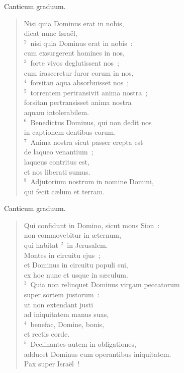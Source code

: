 \lettrine[lines=3,image=true,loversize=0.05,lraise=-0.03]{C}{}anticum graduum. \begin{flushleft}\begin{verse}\vspace{6pt}Nisi quia Dominus erat in nobis,\\ dicat nunc Isra\"el,\\
${}^{2}$~nisi quia Dominus erat in nobis~:\\ cum exsurgerent homines in nos,\\
${}^{3}$~forte vivos deglutissent nos~;\\ cum irasceretur furor eorum in nos,\\
${}^{4}$~forsitan aqua absorbuisset nos~;\\
${}^{5}$~torrentem pertransivit anima nostra~;\\ forsitan pertransisset anima nostra\\ aquam intolerabilem.\\
${}^{6}$~Benedictus Dominus, qui non dedit nos\\ in captionem dentibus eorum.\\
${}^{7}$~Anima nostra sicut passer erepta est\\ de laqueo venantium~;\\ laqueus contritus est,\\ et nos liberati sumus.\\
${}^{8}$~Adjutorium nostrum in nomine Domini,\\ qui fecit c\ae lum et terram.\end{verse}\end{flushleft}



\lettrine[lines=3,image=true,loversize=0.05,lraise=-0.03]{C}{}anticum graduum. \begin{flushleft}\begin{verse}\vspace{6pt}Qui confidunt in Domino, sicut mons Sion~:\\ non commovebitur in \ae ternum,\\ qui habitat
${}^{2}$~in Jerusalem.\\ Montes in circuitu ejus~;\\ et Dominus in circuitu populi sui,\\ ex hoc nunc et usque in s\ae culum.\\
${}^{3}$~Quia non relinquet Dominus virgam peccatorum\\ super sortem justorum~:\\ ut non extendant justi\\ ad iniquitatem manus suas,\\
${}^{4}$~benefac, Domine, bonis,\\ et rectis corde.\\
${}^{5}$~Declinantes autem in obligationes,\\ adducet Dominus cum operantibus iniquitatem.\\ Pax super Isra\"el~!\end{verse}\end{flushleft}



